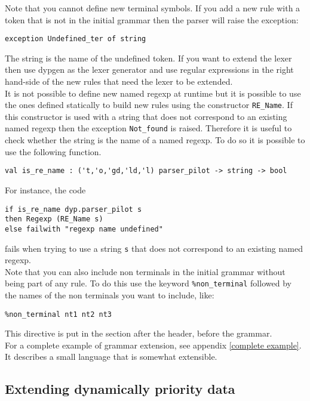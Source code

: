 \documentclass[12pt]{article}
\begin{document}
{Note that you cannot define new terminal symbols. If you add a new rule with a token that is not in the initial grammar then the parser will raise the exception:
\begin{verbatim}
exception Undefined_ter of string
\end{verbatim}
The string is the name of the undefined token. If you want to extend the lexer then use dypgen as the lexer generator and use regular expressions in the right hand-side of the new rules that need the lexer to be extended.\\

It is not possible to define new named regexp at runtime but it is possible to use the ones defined statically to build new rules using the constructor \verb|RE_Name|. If this constructor is used with a string that does not correspond to an existing named regexp then the exception \verb|Not_found| is raised. Therefore it is useful to check whether the string is the name of a named regexp. To do so it is possible to use the following function.
\begin{verbatim}
val is_re_name : ('t,'o,'gd,'ld,'l) parser_pilot -> string -> bool
\end{verbatim}
For instance, the code
\begin{verbatim}
if is_re_name dyp.parser_pilot s
then Regexp (RE_Name s)
else failwith "regexp name undefined"
\end{verbatim}
fails when trying to use a string \verb|s| that does not correspond to an existing named regexp.\\

Note that you can also include non terminals in the initial grammar without being part of any rule. To do this use the keyword \verb|%non_terminal| followed by the names of the non terminals you want to include, like:
\begin{verbatim}
%non_terminal nt1 nt2 nt3
\end{verbatim}
This directive is put in the section after the header, before the grammar.\\

For a complete example of grammar extension, see appendix \ref{complete example}. It describes a small language that is somewhat extensible.

\subsection{Extending dynamically priority data}\label{dynamic priority}

}
\end{document}
